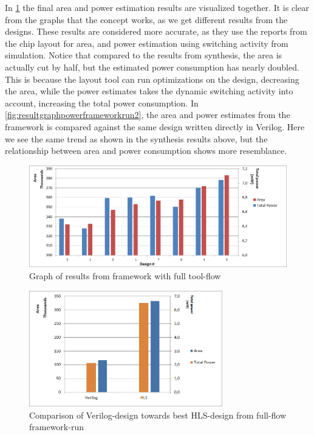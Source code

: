 In \cref{fig:resultgraphframeworkrun3} the final area and power estimation results are visualized together. It is clear from the graphs that the concept works, as we get different results from the designs. These results are considered more accurate, as they use the reports from the chip layout for area, and power estimation using switching activity from simulation. Notice that compared to the results from synthesis, the area is actually cut by half, but the estimated power consumption has nearly doubled. This is because the layout tool can run optimizations on the design, decreasing the area, while the power estimates takes the dynamic switching activity into account, increasing the total power consumption. In \cref{fig:resultgraphpowerframeworkrun2}, the area and power estimates from the framework is compared against the same design written directly in Verilog. Here we see the same trend as shown in the synthesis results above, but the relationship between area and power consumption shows more resemblance.

\begin{figure}[hbpt]
\centering
\includegraphics[width=\textwidth]{../figs/resultGraph3.png}
\caption{\label{fig:resultgraphframeworkrun3}Graph of results from framework with full tool-flow}
\end{figure}

\begin{figure}[hbpt]
\centering
\includegraphics[width=0.75\textwidth]{../figs/resultComparison3.png}
\caption{\label{fig:resultcomparisonhlsrun3}Comparison of Verilog-design towards best HLS-design from full-flow framework-run}
\end{figure}

